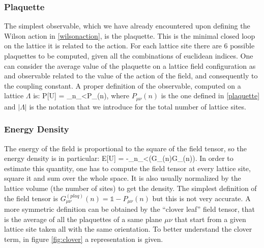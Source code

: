 \subsubsection{Plaquette}
The simplest observable, which we have already encountered upon defining the Wilson action in \cref{wilsonaction}, is the plaquette. This is the minimal closed loop on the lattice it is related to the action. For each lattice site there are 6 possible plaquettes to be computed, given all the combinations of euclidean indices. One can consider the average value of the plaquette on a lattice field configuration as and observable related to the value of the action of the field, and consequently to the coupling constant. A proper definition of the observable, computed on a lattice $\Lambda$ is:
\beq
    P[U] = \sum_{n\in\Lambda}\sum_{\mu<\nu}P_{\mu\nu}(n),
\eeq
where $P_{\mu\nu}(n)$ is the one defined in \cref{plaquette} and $|\Lambda|$ is the notation that we introduce for the total number of lattice sites. \\

\subsubsection{Energy Density}
The energy of the field is proportional to the square of the field tensor, so the energy density is in particular:
\beq
    E[U] = -\sum_{n\in\Lambda}\sum_{\mu<\nu}\Tr(G_{\mu\nu}(n)G_{\mu\nu}(n)).
    \label{eq:energy}
\eeq
In order to estimate this quantity, one has to compute the field tensor at every lattice site, square it and sum over the whole space. It is also usually normalized by the lattice volume (the number of sites) to get the density. The simplest definition of the field tensor is $G_{\mu\nu}^{(plaq)}(n) = \mathds{1} - P_{\mu\nu}(n)$ but this is not very accurate. A more symmetric definition can be obtained by the ``clover leaf'' field tensor, that is the average of all the plaquettes of a same plane $\mu\nu$ that start from a given lattice site taken all with the same orientation. To better understand the clover term, in figure \cref{fig:clover} a representation is given.


